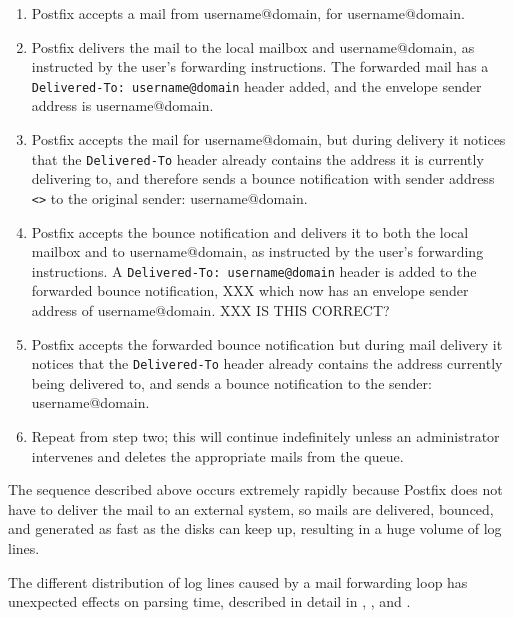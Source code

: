 \begin{enumerate}

    \item Postfix accepts a mail from username@domain, for username@domain.

    \item Postfix delivers the mail to the local mailbox and
        username@domain, as instructed by the user's forwarding
        instructions. The forwarded mail has a
        \texttt{Delivered-To:~username@domain} header added, and the
        envelope sender address is username@domain.

    \item Postfix accepts the mail for username@domain, but during delivery
        it notices that the \texttt{Delivered-To} header already contains
        the address it is currently delivering to, and therefore sends a
        bounce notification with sender address \texttt{<>}\glsadd{<>} to
        the original sender: username@domain.

    \item Postfix accepts the bounce notification and delivers it to both
        the local mailbox and to username@domain, as instructed by the
        user's forwarding instructions.  A
        \texttt{Delivered-To:~username@domain} header is added to the
        forwarded bounce notification, XXX which now has an envelope sender
        address of username@domain.   XXX IS THIS CORRECT\@?

    \item Postfix accepts the forwarded bounce notification but during mail
        delivery it notices that the \texttt{Delivered-To} header already
        contains the address currently being delivered to, and sends a
        bounce notification to the sender: username@domain.

    \item Repeat from step two; this will continue indefinitely unless an
        administrator intervenes and deletes the appropriate mails from the
        queue.

\end{enumerate}

The sequence described above occurs extremely rapidly because Postfix does
not have to deliver the mail to an external system, so mails are delivered,
bounced, and generated as fast as the disks can keep up, resulting in a
huge volume of log lines.

The different distribution of log lines caused by a mail forwarding loop
has unexpected effects on parsing time, described in detail in
, , and .

